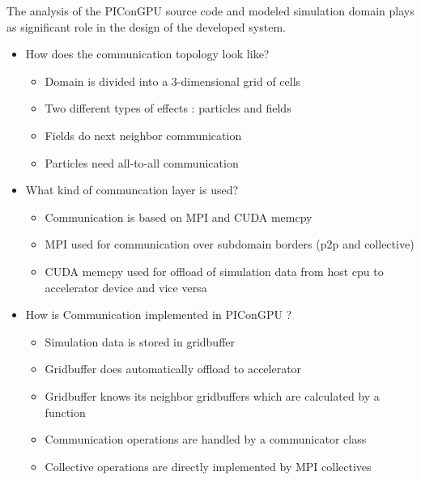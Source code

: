 
The analysis of the PIConGPU source code and modeled simulation domain
plays as significant role in the design of the developed system.

\begin{itemize}
\item How does the communication topology look like?
  \begin{itemize}
  \item Domain is divided into a 3-dimensional grid of cells
  \item Two different types of effects : particles and fields
  \item Fields do next neighbor communication 
  \item Particles need all-to-all communication
  \end{itemize}

  \item What kind of communcation layer is used?
    \begin{itemize}
      \item Communication is based on MPI and CUDA memcpy
      \item MPI used for communication over subdomain borders (p2p and collective)
      \item CUDA memcpy used for offload of simulation data from 
        host cpu to accelerator device and vice versa
    \end{itemize}

  \item How is Communication implemented in PIConGPU ?
    \begin{itemize}
      \item Simulation data is stored in gridbuffer
      \item Gridbuffer does automatically offload to accelerator
      \item Gridbuffer knows its neighbor gridbuffers which
        are calculated by a function
      \item Communication operations are handled by a communicator class
      \item Collective operations are directly implemented by
        MPI collectives
    \end{itemize}

\end{itemize}


